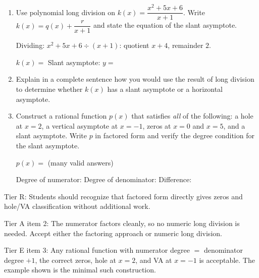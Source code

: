 \documentclass[10pt]{article}
\begin{document}
\begin{tcolorbox}[colback=white, colframe=black!40,
    title=\textbf{Tier E --- Extend},
    fonttitle=\bfseries, arc=2mm, left=3mm, right=3mm, top=2mm, bottom=2mm]

\begin{enumerate}[itemsep=10pt]
  \item Use polynomial long division on $k(x) = \dfrac{x^2 + 5x + 6}{x+1}$.
        Write $k(x) = q(x) + \dfrac{r}{x+1}$ and state the equation of the slant asymptote.

        \vspace{0.06in}
        Dividing: $x^2+5x+6 \div (x+1)$: quotient $x+4$, remainder $2$.

        $k(x) = $  \quad Slant asymptote: $y = $ 

  \item Explain in a complete sentence how you would use the result of long division to determine
        whether $k(x)$ has a slant asymptote or a horizontal asymptote.

        \vspace{0.06in}

  \item Construct a rational function $p(x)$ that satisfies \textit{all} of the following:
        a hole at $x = 2$, a vertical asymptote at $x = -1$, zeros at $x = 0$ and $x = 5$,
        and a slant asymptote. Write $p$ in factored form and verify the degree condition for the
        slant asymptote.

        \vspace{0.06in}
        $p(x) = $  (many valid answers)

        \vspace{0.04in}
        Degree of numerator:  \quad Degree of denominator:  \quad Difference: 
\end{enumerate}
\end{tcolorbox}

\begin{teachernote}
Tier R: Students should recognize that factored form directly gives zeros and hole/VA classification without additional work.

Tier A item 2: The numerator factors cleanly, so no numeric long division is needed. Accept either the factoring approach or numeric long division.

Tier E item 3: Any rational function with numerator degree $=$ denominator degree $+ 1$, the correct zeros, hole at $x=2$, and VA at $x=-1$ is acceptable. The example shown is the minimal such construction.
\end{teachernote}
\end{document}
